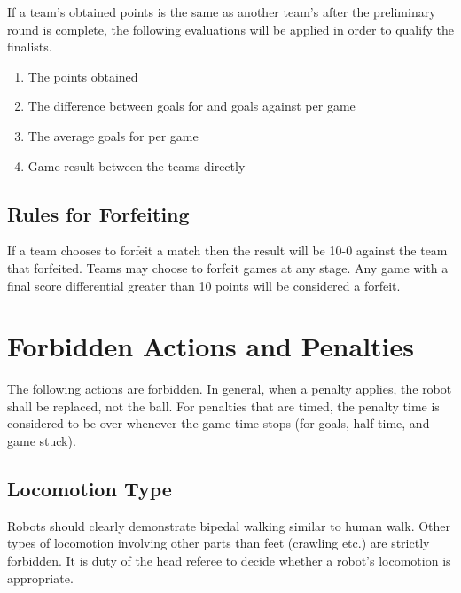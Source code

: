 \documentclass[12pt]{article}
\begin{document}

If a team's obtained points is the same as another team's after the preliminary round is complete, the following evaluations will be applied in order to qualify the finalists.

\begin{enumerate}

\item The points obtained

\item The
 difference between goals for and goals against per game

\item The average goals for per game

\item Game result between the teams directly

\end{enumerate}

\subsection{Rules for Forfeiting}

If a team chooses to forfeit a match then the result will be 10-0 against the team that forfeited. Teams may choose to forfeit games at any stage. Any game with a final score differential greater than 10 points will be considered a forfeit.

\section{Forbidden Actions and Penalties}
\label{sec:forbidden_act}

The following actions are forbidden. In general, when a penalty applies, the robot shall be replaced, not the ball. For penalties that are timed, the penalty time is considered to be over whenever the game time stops (for goals, half-time, and game stuck).

\subsection{Locomotion Type}
\label{sec:locomotion_type}

Robots should clearly demonstrate bipedal walking similar to human walk. Other types of locomotion involving other parts than feet (crawling etc.) are strictly forbidden. It is duty of the head referee to decide whether a robot's locomotion is appropriate.
\end{document}
